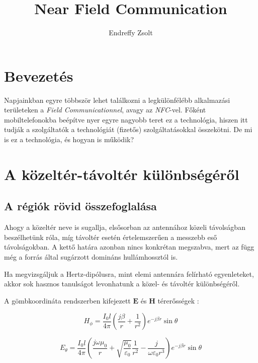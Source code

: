 \documentclass[12pt]{article}
\author{Endreffy Zsolt}
\title{Near Field Communication}
\begin{document}
\maketitle

\pagebreak

\tableofcontents

\pagebreak

\section{Bevezetés}
Napjainkban egyre többször lehet találkozni a legkülönfélébb alkalmazási 
területeken a \emph{Field Communicationnel}, avagy az \emph{NFC}-vel.
Főként mobiltelefonokba beépítve nyer egyre nagyobb teret ez a technológia,
hiszen itt tudják a szolgáltatók a technológiát (fizetős) szolgáltatásokkal
összekötni.
De mi is ez a technológia, és hogyan is működik?

\section{A közeltér-távoltér különbségéről}

\subsection{A régiók rövid összefoglalása}
Ahogy a közeltér neve is sugallja, elsősorban az antennához közeli távolságban
beszélhetünk róla, míg távoltér esetén értelemszerűen a messzebb eső 
távolságokban. A kettő határa azonban nincs konkrétan megszabva, mert az
függ még a forrás által sugárzott domináns hullámhossztól is.

Ha megvizsgáljuk a Hertz-dipólusra, mint elemi antennára felírható egyenleteket,
akkor sok hasznos tanulságot levonhatunk a közel- és távoltér különbségéről.

A gömbkoordináta rendszerben kifejezett $\mathbf{E}$ és $\mathbf{H}$ térerősségek
\cite[177.~oldal]{elektromagnesesterek}:

\begin{equation}
H_{\phi} =  \frac{I_0 l}{4 \pi}
\left( \frac{j\beta}{r} + \frac{1}{r^2} \right)
e^{-j\beta r} \sin \theta
\end{equation}

\begin{equation}
E_{\theta} = \frac{I_0 l}{4 \pi}
\left( \frac{j\omega \mu_0}{r}
+ \sqrt{\frac{\mu_0}{\varepsilon_0}}\frac{1}{r^2}
- \frac{j}{\omega \varepsilon_0 r^3} \right)
e^{-j\beta r} \sin \theta
\end{equation}
\end{document}
